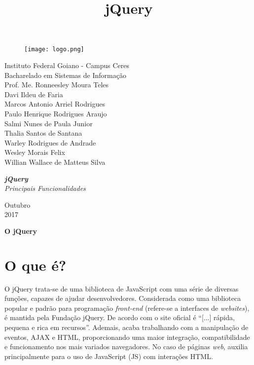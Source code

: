 \documentclass[12pt,a4paper]{article}
\title{jQuery}
\begin{document}
\begin{titlepage}


\begin{center}
\begin{figure}[htb]
		
		\label{figura:LogoIF}
	
		\centering
		\texttt{[image: logo.png]} 
\end{figure}


Instituto Federal Goiano - Campus Ceres\\
Bacharelado em Sistemas de Informação\\
Prof. Me. Ronneesley Moura Teles\\\vspace{0.2cm}
Davi Ildeu de Faria \\
Marcos Antonio Arriel Rodrigues \\
Paulo Henrique Rodrigues Araujo \\
Salmi Nunes de Paula Junior \\
Thalia Santos de Santana\\
Warley Rodrigues de Andrade \\
Wesley Morais Felix \\
Willian Wallace de Matteus Silva\\\vspace{6.0cm}

\textit{\textbf{\Large{jQuery}}}\\\vspace{0.5cm}
\textit{\Large{Principais Funcionalidades}}\\\vspace{8.5cm}

Outubro\\
2017\\
\end{center}
\end{titlepage}



\tableofcontents

\newpage
\begin{center}
\textbf{\Large{O jQuery}}\\\vspace{0.5cm}
\end{center}
\section{O que é?}%

O jQuery trata-se de uma biblioteca de JavaScript com uma série de diversas funções, capazes de ajudar desenvolvedores. Considerada como uma biblioteca popular e padrão para programação \textit{front-end} (refere-se a interfaces de \textit{websites}), é mantida pela Fundação jQuery. De acordo com o site oficial é “[...] rápida, pequena e rica em recursos”. Ademais, acaba trabalhando com a manipulação de eventos, AJAX e HTML, proporcionando uma maior integração, compatibilidade e funcionamento nos mais variados navegadores. No caso de páginas \textit{web}, auxilia principalmente para o uso de JavaScript (JS) com interações HTML.
\end{document}
